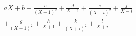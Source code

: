 \begin{multline*}
 aX + b +\frac{c}{(X-1)^2}+ \frac{d}{X-1}
+\frac{e}{(X-i)^2}+ \frac{f}{X-i} \\
+\frac{g}{(X+1)^2}+ \frac{h}{X+1}
+\frac{k}{(X+i)^2}+ \frac{l}{X+i}
\end{multline*}
